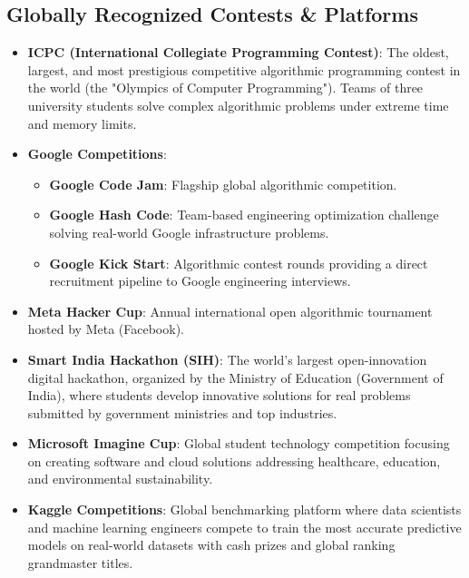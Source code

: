 \subsection{Globally Recognized Contests \& Platforms}
\begin{itemize}[leftmargin=1.5em]
    \item \textbf{ICPC (International Collegiate Programming Contest)}: The oldest, largest, and most prestigious competitive algorithmic programming contest in the world (the "Olympics of Computer Programming"). Teams of three university students solve complex algorithmic problems under extreme time and memory limits.
    \item \textbf{Google Competitions}:
    \begin{itemize}
        \item \textbf{Google Code Jam}: Flagship global algorithmic competition.
        \item \textbf{Google Hash Code}: Team-based engineering optimization challenge solving real-world Google infrastructure problems.
        \item \textbf{Google Kick Start}: Algorithmic contest rounds providing a direct recruitment pipeline to Google engineering interviews.
    \end{itemize}
    \item \textbf{Meta Hacker Cup}: Annual international open algorithmic tournament hosted by Meta (Facebook).
    \item \textbf{Smart India Hackathon (SIH)}: The world's largest open-innovation digital hackathon, organized by the Ministry of Education (Government of India), where students develop innovative solutions for real problems submitted by government ministries and top industries.
    \item \textbf{Microsoft Imagine Cup}: Global student technology competition focusing on creating software and cloud solutions addressing healthcare, education, and environmental sustainability.
    \item \textbf{Kaggle Competitions}: Global benchmarking platform where data scientists and machine learning engineers compete to train the most accurate predictive models on real-world datasets with cash prizes and global ranking grandmaster titles.
\end{itemize}

